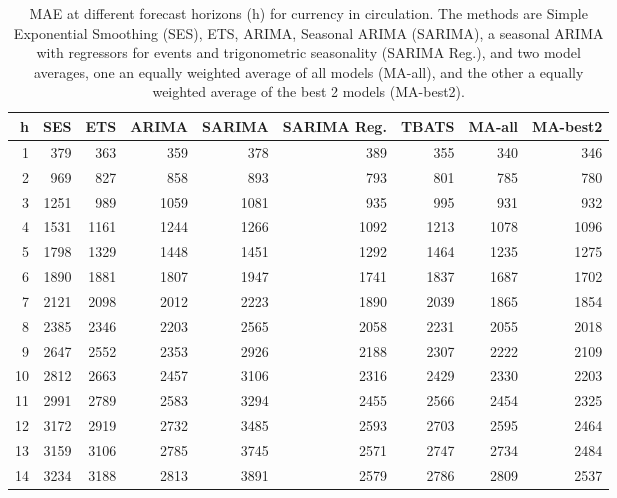 \begin{table}[ht]
\centering
\begin{tabular}{rrrrrrrrr}
  \hline
h & SES & ETS & ARIMA & SARIMA & SARIMA Reg. & TBATS & MA-all & MA-best2 \\ 
  \hline
1 & 379 & 363 & 359 & 378 & 389 & 355 & 340 & 346 \\ 
  2 & 969 & 827 & 858 & 893 & 793 & 801 & 785 & 780 \\ 
  3 & 1251 & 989 & 1059 & 1081 & 935 & 995 & 931 & 932 \\ 
  4 & 1531 & 1161 & 1244 & 1266 & 1092 & 1213 & 1078 & 1096 \\ 
  5 & 1798 & 1329 & 1448 & 1451 & 1292 & 1464 & 1235 & 1275 \\ 
  6 & 1890 & 1881 & 1807 & 1947 & 1741 & 1837 & 1687 & 1702 \\ 
  7 & 2121 & 2098 & 2012 & 2223 & 1890 & 2039 & 1865 & 1854 \\ 
  8 & 2385 & 2346 & 2203 & 2565 & 2058 & 2231 & 2055 & 2018 \\ 
  9 & 2647 & 2552 & 2353 & 2926 & 2188 & 2307 & 2222 & 2109 \\ 
  10 & 2812 & 2663 & 2457 & 3106 & 2316 & 2429 & 2330 & 2203 \\ 
  11 & 2991 & 2789 & 2583 & 3294 & 2455 & 2566 & 2454 & 2325 \\ 
  12 & 3172 & 2919 & 2732 & 3485 & 2593 & 2703 & 2595 & 2464 \\ 
  13 & 3159 & 3106 & 2785 & 3745 & 2571 & 2747 & 2734 & 2484 \\ 
  14 & 3234 & 3188 & 2813 & 3891 & 2579 & 2786 & 2809 & 2537 \\ 
   \hline
\end{tabular}
\caption{MAE at different forecast horizons (h) for currency in circulation. The methods are Simple Exponential Smoothing (SES), ETS, ARIMA, Seasonal ARIMA (SARIMA), a seasonal ARIMA with regressors for events and trigonometric seasonality (SARIMA Reg.), and two model averages, one an equally weighted average of all models (MA-all), and the other a equally weighted average of the best 2 models (MA-best2).} 
\label{tab:maecic}
\end{table}


